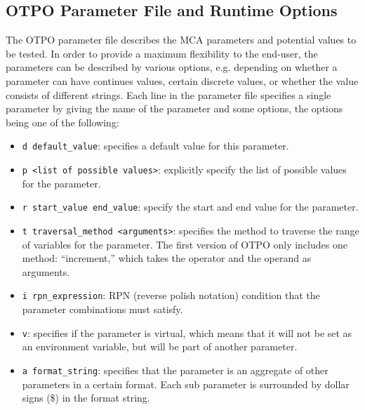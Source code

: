 


\subsection{OTPO Parameter File and Runtime Options}

The OTPO parameter file describes the MCA parameters and potential
values to be tested. In order to provide a maximum flexibility to the
end-user, the parameters can be described by various options,
e.g. depending on whether a parameter can have continues values,
certain discrete values, or whether the value consists of different
strings. Each line in the parameter file specifies a single parameter
by giving the name of the parameter and some options, the options
being one of the following:
\begin{itemize}
\item {\tt d default\_\-value}: specifies a default value for this
  parameter.
\item {\tt p <list of possible values>}: explicitly specify the list
  of possible values for the parameter.
\item {\tt r start\_\-value end\_\-value}: specify the start and end
  value for the parameter.
\item {\tt t traversal\_\-method <arguments>}: specifies the method to
  traverse the range of variables for the parameter. The first version
  of OTPO only includes one method: ``increment,'' which takes the
  operator and the operand as arguments.
\item {\tt i rpn\_\-expression}: RPN (reverse polish notation)
  condition that the parameter combinations must satisfy.
\item {\tt v}: specifies if the parameter is virtual, which means that
  it will not be set as an environment variable, but will be part of
  another parameter.
\item {\tt a format\_\-string}: specifies that the parameter is an
  aggregate of other parameters in a certain format. Each sub
  parameter is surrounded by dollar signs (\$) in the format string.
\end{itemize}

